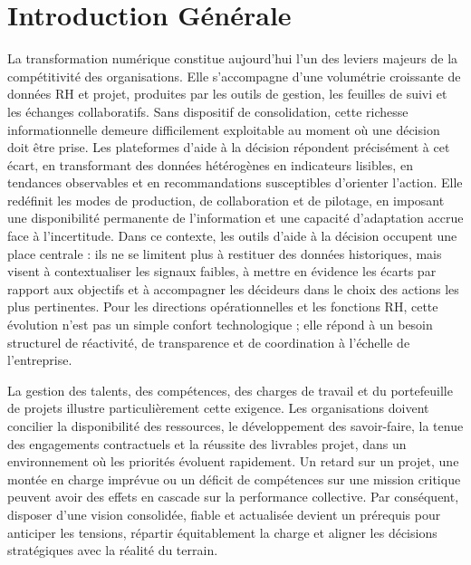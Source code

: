 \chapter*{Introduction Générale}

La transformation numérique constitue aujourd'hui l'un des leviers majeurs de la compétitivité des organisations. Elle s'accompagne d'une volumétrie croissante de données RH et projet, produites par les outils de gestion, les feuilles de suivi et les échanges collaboratifs. Sans dispositif de consolidation, cette richesse informationnelle demeure difficilement exploitable au moment où une décision doit être prise. Les plateformes d'aide à la décision répondent précisément à cet écart, en transformant des données hétérogènes en indicateurs lisibles, en tendances observables et en recommandations susceptibles d'orienter l'action. Elle redéfinit les modes de production, de collaboration et de pilotage, en imposant une disponibilité permanente de l'information et une capacité d'adaptation accrue face à l'incertitude. Dans ce contexte, les outils d'aide à la décision occupent une place centrale : ils ne se limitent plus à restituer des données historiques, mais visent à contextualiser les signaux faibles, à mettre en évidence les écarts par rapport aux objectifs et à accompagner les décideurs dans le choix des actions les plus pertinentes. Pour les directions opérationnelles et les fonctions RH, cette évolution n'est pas un simple confort technologique ; elle répond à un besoin structurel de réactivité, de transparence et de coordination à l'échelle de l'entreprise.

La gestion des talents, des compétences, des charges de travail et du portefeuille de projets illustre particulièrement cette exigence. Les organisations doivent concilier la disponibilité des ressources, le développement des savoir-faire, la tenue des engagements contractuels et la réussite des livrables projet, dans un environnement où les priorités évoluent rapidement. Un retard sur un projet, une montée en charge imprévue ou un déficit de compétences sur une mission critique peuvent avoir des effets en cascade sur la performance collective. Par conséquent, disposer d'une vision consolidée, fiable et actualisée devient un prérequis pour anticiper les tensions, répartir équitablement la charge et aligner les décisions stratégiques avec la réalité du terrain.

